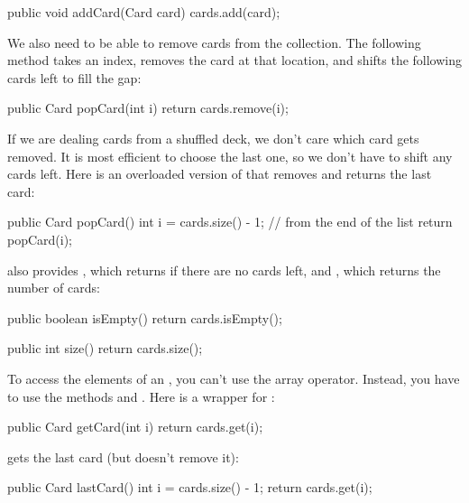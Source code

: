 \begin{code}
public void addCard(Card card) {
    cards.add(card);
}
\end{code}

We also need to be able to remove cards from the collection.
The following method takes an index, removes the card at that location, and shifts the following cards left to fill the gap:

\begin{code}
public Card popCard(int i) {
    return cards.remove(i);
}
\end{code}


If we are dealing cards from a shuffled deck, we don't care which card gets removed.
It is most efficient to choose the last one, so we don't have to shift any cards left.
Here is an overloaded version of  that removes and returns the last card:

\begin{code}
public Card popCard() {
    int i = cards.size() - 1;    // from the end of the list
    return popCard(i);
}
\end{code}

 also provides , which returns  if there are no cards left, and , which returns the number of cards:

\begin{code}
public boolean isEmpty() {
    return cards.isEmpty();
}
\end{code}

\begin{code}
public int size() {
    return cards.size();
}
\end{code}

To access the elements of an , you can't use the array \java{[]} operator.
Instead, you have to use the methods  and .
Here is a wrapper for :

\begin{code}
public Card getCard(int i) {
    return cards.get(i);
}
\end{code}

 gets the last card (but doesn't remove it):

\begin{code}
public Card lastCard() {
    int i = cards.size() - 1;
    return cards.get(i);
}
\end{code}


